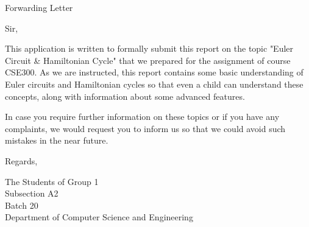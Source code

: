 \documentclass[14pt, times, a4paper]{extarticle}
\begin{document}
\newpage
\begin{center}
    \huge Forwarding Letter
\end{center}
\vspace{1cm}

\noindent Sir,
\vspace{0.5cm}

\noindent This application is written to formally submit this report on the topic "Euler Circuit \& Hamiltonian Cycle" that we prepared for the assignment of course CSE300. As we are instructed, this report contains some basic understanding of Euler circuits and Hamiltonian cycles so that even a child can understand these concepts, along with information about some advanced features.
\vspace{0.5cm}

\noindent In case you require further information on these topics or if you have any complaints, we would request you to inform us so that we could avoid such mistakes in the near future.
\vspace{0.5cm}

\noindent Regards,
\vspace{0.5cm}

\noindent The Students of Group 1 \\
Subsection A2 \\
Batch 20\\
Department of Computer Science and Engineering


\newpage
\tableofcontents


\newpage
\listoffigures


\newpage
\end{document}
